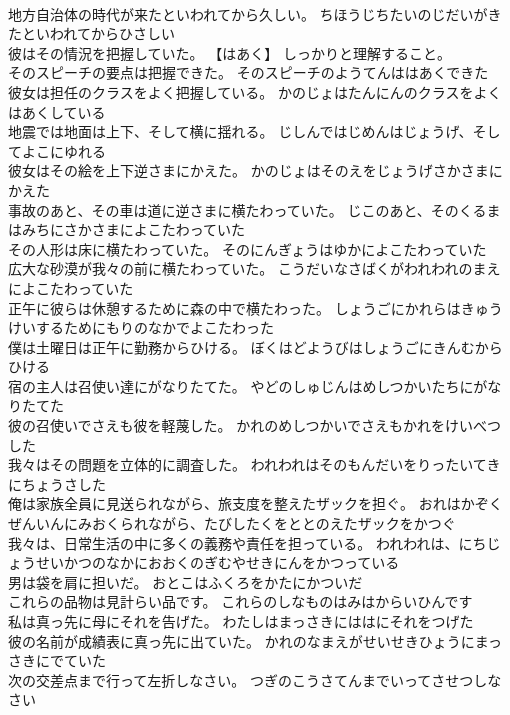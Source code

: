 \documentclass[8pt]{extreport}
\begin{document}
\begin{CJK}{UTF8}{min}
\\	地方自治体の時代が来たといわれてから久しい。	ちほうじちたいのじだいがきたといわれてからひさしい 
\\	彼はその情況を把握していた。	【はあく】 しっかりと理解すること。
\\	そのスピーチの要点は把握できた。	そのスピーチのようてんははあくできた 
\\	彼女は担任のクラスをよく把握している。	かのじょはたんにんのクラスをよくはあくしている 
\\	地震では地面は上下、そして横に揺れる。	じしんではじめんはじょうげ、そしてよこにゆれる 
\\	彼女はその絵を上下逆さまにかえた。	かのじょはそのえをじょうげさかさまにかえた 
\\	事故のあと、その車は道に逆さまに横たわっていた。	じこのあと、そのくるまはみちにさかさまによこたわっていた 
\\	その人形は床に横たわっていた。	そのにんぎょうはゆかによこたわっていた 
\\	広大な砂漠が我々の前に横たわっていた。	こうだいなさばくがわれわれのまえによこたわっていた 
\\	正午に彼らは休憩するために森の中で横たわった。	しょうごにかれらはきゅうけいするためにもりのなかでよこたわった 
\\	僕は土曜日は正午に勤務からひける。	ぼくはどようびはしょうごにきんむからひける 
\\	宿の主人は召使い達にがなりたてた。	やどのしゅじんはめしつかいたちにがなりたてた 
\\	彼の召使いでさえも彼を軽蔑した。	かれのめしつかいでさえもかれをけいべつした 
\\	我々はその問題を立体的に調査した。	われわれはそのもんだいをりったいてきにちょうさした 
\\	俺は家族全員に見送られながら、旅支度を整えたザックを担ぐ。	おれはかぞくぜんいんにみおくられながら、たびしたくをととのえたザックをかつぐ 
\\	我々は、日常生活の中に多くの義務や責任を担っている。	われわれは、にちじょうせいかつのなかにおおくのぎむやせきにんをかつっている 
\\	男は袋を肩に担いだ。	おとこはふくろをかたにかついだ 
\\	これらの品物は見計らい品です。	これらのしなものはみはからいひんです 
\\	私は真っ先に母にそれを告げた。	わたしはまっさきにははにそれをつげた 
\\	彼の名前が成績表に真っ先に出ていた。	かれのなまえがせいせきひょうにまっさきにでていた 
\\	次の交差点まで行って左折しなさい。	つぎのこうさてんまでいってさせつしなさい 

\end{CJK}
\end{document}
